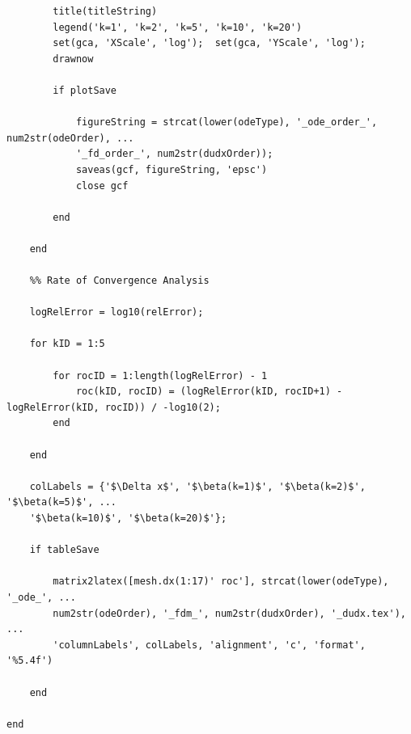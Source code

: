 \documentclass[10pt, reqno]{article}		%
\numberwithin{equation}{section}
\begin{document}
\begin{lstlisting}
		title(titleString)
		legend('k=1', 'k=2', 'k=5', 'k=10', 'k=20')
		set(gca, 'XScale', 'log');  set(gca, 'YScale', 'log');
		drawnow
	
		if plotSave
		
			figureString = strcat(lower(odeType), '_ode_order_', num2str(odeOrder), ...
			'_fd_order_', num2str(dudxOrder));
			saveas(gcf, figureString, 'epsc')
			close gcf
		
		end
	
	end
	
	%% Rate of Convergence Analysis
	
	logRelError = log10(relError);
	
	for kID = 1:5
	
		for rocID = 1:length(logRelError) - 1
			roc(kID, rocID) = (logRelError(kID, rocID+1) - logRelError(kID, rocID)) / -log10(2);
		end
	
	end
	
	colLabels = {'$\Delta x$', '$\beta(k=1)$', '$\beta(k=2)$', '$\beta(k=5)$', ...
	'$\beta(k=10)$', '$\beta(k=20)$'};
	
	if tableSave
	
		matrix2latex([mesh.dx(1:17)' roc'], strcat(lower(odeType), '_ode_', ...
		num2str(odeOrder), '_fdm_', num2str(dudxOrder), '_dudx.tex'), ...
		'columnLabels', colLabels, 'alignment', 'c', 'format', '%5.4f')
	
	end

end
\end{lstlisting}
\end{document}
